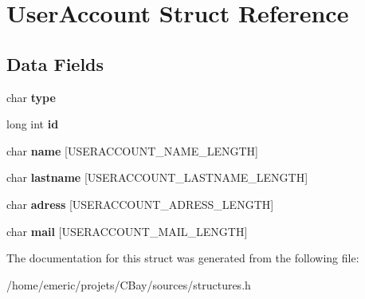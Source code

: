 \hypertarget{struct_user_account}{\section{User\-Account Struct Reference}
\label{struct_user_account}
}
\subsection*{Data Fields}
\begin{DoxyCompactItemize}
\item 
\hypertarget{struct_user_account_aff17911edc8208aa8ddb1c7c52c78389}{char {\bfseries type}}\label{struct_user_account_aff17911edc8208aa8ddb1c7c52c78389}

\item 
\hypertarget{struct_user_account_a53f4656a3ccbae3d40e94f582eef745f}{long int {\bfseries id}}\label{struct_user_account_a53f4656a3ccbae3d40e94f582eef745f}

\item 
\hypertarget{struct_user_account_ab3f0e8a7b7c292feb10bb01486452533}{char {\bfseries name} \mbox{[}U\-S\-E\-R\-A\-C\-C\-O\-U\-N\-T\-\_\-\-N\-A\-M\-E\-\_\-\-L\-E\-N\-G\-T\-H\mbox{]}}\label{struct_user_account_ab3f0e8a7b7c292feb10bb01486452533}

\item 
\hypertarget{struct_user_account_a570366d76c40b10dee4a3db834bc53be}{char {\bfseries lastname} \mbox{[}U\-S\-E\-R\-A\-C\-C\-O\-U\-N\-T\-\_\-\-L\-A\-S\-T\-N\-A\-M\-E\-\_\-\-L\-E\-N\-G\-T\-H\mbox{]}}\label{struct_user_account_a570366d76c40b10dee4a3db834bc53be}

\item 
\hypertarget{struct_user_account_accd59deb6270e807cd96a582c141e631}{char {\bfseries adress} \mbox{[}U\-S\-E\-R\-A\-C\-C\-O\-U\-N\-T\-\_\-\-A\-D\-R\-E\-S\-S\-\_\-\-L\-E\-N\-G\-T\-H\mbox{]}}\label{struct_user_account_accd59deb6270e807cd96a582c141e631}

\item 
\hypertarget{struct_user_account_aa9bbf7bea4117b927642aee2875821d9}{char {\bfseries mail} \mbox{[}U\-S\-E\-R\-A\-C\-C\-O\-U\-N\-T\-\_\-\-M\-A\-I\-L\-\_\-\-L\-E\-N\-G\-T\-H\mbox{]}}\label{struct_user_account_aa9bbf7bea4117b927642aee2875821d9}

\end{DoxyCompactItemize}


The documentation for this struct was generated from the following file\-:\begin{DoxyCompactItemize}
\item 
/home/emeric/projets/\-C\-Bay/sources/structures.\-h\end{DoxyCompactItemize}
